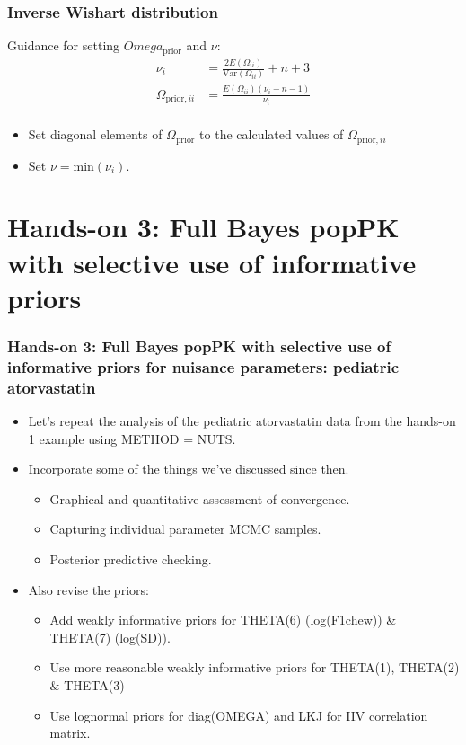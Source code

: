 \documentclass{beamer}
\begin{document}
\begin{frame}
  \frametitle{Inverse Wishart distribution}

Guidance for setting $Omega_\text{prior}$ and $\nu$:
\begin{align*}
  \nu_i &=
  \frac{2E\left(\Omega_{ii}\right)}{\text{Var}\left(\Omega_{ii}\right)} + n
  + 3 \\
\Omega_{\text{prior},ii} &= \frac{E\left(\Omega_{ii}\right)\left(\nu_i - n -
                          1\right)}{\nu_i} \\
\end{align*}
\begin{itemize}
\item Set diagonal elements of $\Omega_\text{prior}$ to the calculated values
of $\Omega_{\text{prior},ii}$
\item Set $\nu = \text{min}\left(\nu_i\right)$.
\end{itemize}

\end{frame}

\section[Hands-on 3: Full Bayes popPK]{Hands-on 3: Full Bayes popPK with selective use of
  informative priors}

\begin{frame}
  \frametitle{Hands-on 3: Full Bayes popPK with selective use of
    informative priors for nuisance parameters: pediatric
    atorvastatin}
  
  \begin{itemize}
  \item Let's repeat the analysis of the pediatric atorvastatin data
    from the hands-on 1 example using METHOD = NUTS.
\item Incorporate some of the things we've discussed since then.
  \begin{itemize}
\item Graphical and quantitative assessment of convergence.
\item Capturing individual parameter MCMC samples.
\item Posterior predictive checking.
\end{itemize}
\item Also revise the priors:
  \begin{itemize}
  \item Add weakly informative priors for THETA(6) (log(F1chew)) \&
    THETA(7) (log(SD)).
    \item Use more reasonable weakly informative priors for THETA(1),
      THETA(2) \& THETA(3)
      \item Use lognormal priors for diag(OMEGA) and LKJ for IIV
        correlation matrix.
  \end{itemize}
  \end{itemize}

\end{frame}
\end{document}
